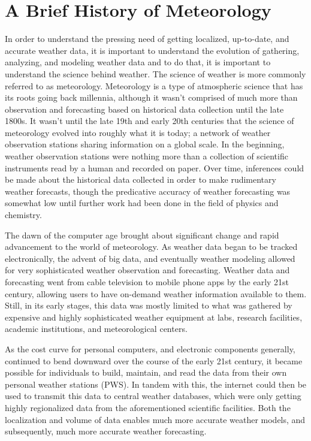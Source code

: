 \documentclass[sigconf]{acmart}
\begin{document}
\section{A Brief History of Meteorology}

In order to understand the pressing need of getting localized, up-to-date, and accurate weather data, it is important to understand the evolution of gathering, analyzing, and modeling weather data and to do that, it is important to understand the science behind weather. The science of weather is more commonly referred to as meteorology. Meteorology is a type of atmospheric science that has its roots going back millennia, although it wasn't comprised of much more than observation and forecasting based on historical data collection until the late 1800s. It wasn't until the late 19th and early 20th centuries that the science of meteorology evolved into roughly what it is today; a network of weather observation stations sharing information on a global scale. In the beginning, weather observation stations were nothing more than a collection of scientific instruments read by a human and recorded on paper. Over time, inferences could be made about the historical data collected in order to make rudimentary weather forecasts, though the predicative accuracy of weather forecasting was somewhat low until further work had been done in the field of physics and chemistry. 

The dawn of the computer age brought about significant change and rapid advancement to the world of meteorology. As weather data began to be tracked electronically, the advent of big data, and eventually weather modeling allowed for very sophisticated weather observation and forecasting. Weather data and forecasting went from cable television to mobile phone apps by the early 21st century, allowing users to have on-demand weather information available to them. Still, in its early stages, this data was mostly limited to what was gathered by expensive and highly sophisticated weather equipment at labs, research facilities, academic institutions, and meteorological centers. 

As the cost curve for personal computers, and electronic components generally, continued to bend downward over the course of the early 21st century, it became possible for individuals to build, maintain, and read the data from their own personal weather stations (PWS). In tandem with this, the internet could then be used to transmit this data to central weather databases, which were only getting highly regionalized data from the aforementioned scientific facilities. Both the localization and volume of data enables much more accurate weather models, and subsequently, much more accurate weather forecasting. 
\end{document}
